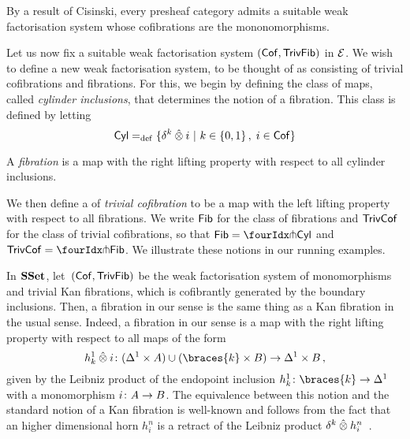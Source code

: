 \documentclass[reqno,10pt,a4paper,oneside,draft]{amsart}
\begin{document}
\begin{example} \label{thm:generation-presheaf-cisinski} By a result of Cisinski, every presheaf category admits a suitable weak factorisation
system whose cofibrations are the mononomorphisms. 
\end{example} 


Let us now fix a suitable weak factorisation system $(\mathsf{Cof},\mathsf{TrivFib})$ in $\mathcal{E}$.
We wish to define a new weak factorisation system, to be thought of as consisting of trivial cofibrations and fibrations. For this, we begin by defining the class of maps, called \emph{cylinder inclusions}, that determines the notion of a fibration. This class is defined by letting
\begin{equation}
\label{equ:cylinc}
\mathsf{Cyl} =_{\operatorname{def}} \{ \delta^k \mathbin{\hat{\otimes}} i \ | \ k \in \{ 0, 1 \} \, , \; i \in \mathsf{Cof} \}
\end{equation}

\begin{definition} \label{non-alg-fib} A \emph{fibration} is a map with the right lifting property with respect to all cylinder inclusions.
\end{definition} 


We then define a of \emph{trivial cofibration} to be a map with the left lifting property with respect to all fibrations.
We write $\mathsf{Fib}$ for the class of fibrations and $\mathsf{TrivCof}$ for the class of trivial cofibrations, so that 
$\Fib = \liftr{\Cyl}$ and $\TrivCof = \liftl{\Fib}$.  We illustrate these notions in our running examples.

\begin{example} \label{thm:fib-is-kan}
In $\mathbf{SSet}$, let~$(\mathsf{Cof}, \mathsf{TrivFib})$  be the weak factorisation system of monomorphisms and trivial Kan fibrations, which is cofibrantly generated
by the boundary inclusions. Then, a fibration in our sense  is the same thing as a Kan fibration in the usual sense. 
Indeed, a fibration in our sense is a map with the right lifting property with respect to all maps of the form
\[
h_k^1 \hatotimes i \co   (\Delta^1 \times A) \cup (\braces{k} \times B) \to  \Delta^1 \times B \, ,
\]
given by the Leibniz product of the endopoint inclusion $h_k^1 \co \braces{k} \to \Delta^1$ with a monomorphism $i \colon A \to B$. The equivalence between this notion and the standard notion of a Kan fibration is well-known and follows from the fact that an higher dimensional horn $h_i^n$ is a retract of the Leibniz product $\delta^k \mathbin{\hat{\otimes}} h_i^n$~\cite[Chap.~IV, Sec.~2]{gabriel-zisman:calculus-of-fractions}.
\end{example}
\end{document}
